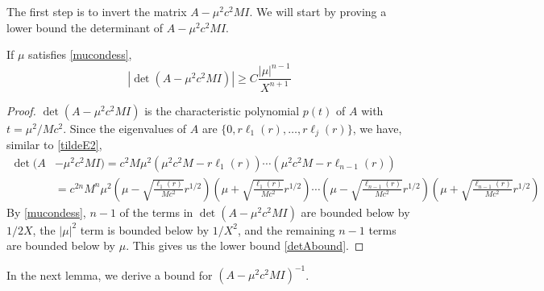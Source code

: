 \documentclass[thesis.tex]{subfiles}
\begin{document}
The first step is to invert the matrix $A - \mu^2 c^2 M I$. We will start by proving  a lower bound the determinant of $A - \mu^2 c^2 M I$. 

\begin{lemma}\label{detAboundlemma}
If $\mu$ satisfies \cref{mucondess},
\begin{equation}\label{detAbound}
|\det(A - \mu^2 c^2 M I)|
\geq C \frac{|\mu|^{n-1}}{X^{n+1}}
\end{equation}
\begin{proof}
$\det(A - \mu^2 c^2 MI)$ is the characteristic polynomial $p(t)$ of $A$ with $t = \mu^2 / M c^2$. Since the eigenvalues of $A$ are $\{0, r \ell_1(r), \dots, r \ell_j(r) \}$, we have, similar to \cref{tildeE2},
\begin{align*}
\det(A &- \mu^2 c^2 M I) = c^2 M \mu^2 \left(\mu^2 c^2 M - r \ell_1(r) \right)\cdots\left(\mu^2 c^2 M - r \ell_{n-1}(r) \right) \\
&= c^{2n} M^n \mu^2 \left( \mu - \sqrt{\frac{\ell_1(r)}{M c^2 }} r^{1/2} \right)\left( \mu + \sqrt{\frac{\ell_1(r)}{M c^2 }} r^{1/2} \right)\cdots\left( \mu - \sqrt{\frac{\ell_{n-1}(r)}{M c^2 }} r^{1/2} \right)\left( \mu + \sqrt{\frac{\ell_{n-1}(r)}{M c^2 }} r^{1/2} \right)
\end{align*}
By \cref{mucondess}, $n-1$ of the terms in $\det(A - \mu^2 c^2 M I)$ are bounded below by $1/2X$, the $|\mu|^2$ term is bounded below by $1/X^2$, and the remaining $n-1$ terms are bounded below by $\mu$. This gives us the lower bound \cref{detAbound}.
\end{proof}
\end{lemma}

In the next lemma, we derive a bound for $(A - \mu^2c^2 M I)^{-1}$.
\end{document}
